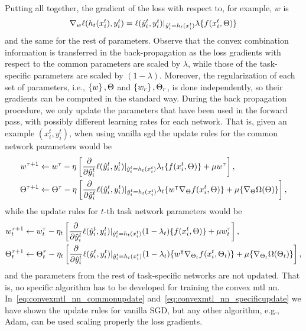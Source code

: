 Putting all together, the gradient of the loss with respect to, for example, $w$ is 
$$  \nabla_w \ell(h_t(x_i^t), y_i^t)  =\ell(\hat{y}_i^t, y_i^t) \vert_{\hat{y}_i^t = h_t(x_i^t)} \lambda \lbrace f(x_i^t, \Theta) \rbrace $$
and the same for the rest of parameters.
%
Observe that the convex combination information is transferred in the back-propagation as the loss gradients with respect to the common parameters are scaled by $\lambda$, while those of the task-specific parameters are scaled by $(1 - \lambda)$.
%
Moreover, the regularization of each set of parameters, i.e., $\left\{w\right\}, \Theta$ and $\left\{w_r\right\}, \Theta_r$, is done independently, so their gradients can be computed in the standard way.
%
During the back propagation procedure, we only update the parameters that have been used in the forward pass, with possibly different learning rates for each network. 
That is, given an example $(x_i^t, y_i^t)$, when using vanilla \acrfull{sgd} the update rules for the common network parameters would be
\begin{equation}\label{eq:convexmtl_nn_commonupdate}
    \begin{aligned}
        w^{\tau + 1} &\gets w^\tau - \eta \left[  \frac{\partial}{\partial \hat{y}_i^t}  \lossf(\hat{y}_i^t, y_i^t) \vert_{\hat{y}_i^t = h_t(x_i^t)} \lambda_t \lbrace f(x_i^t, \Theta) \rbrace + \mu w^\tau \right], \\
        \Theta^{\tau + 1} &\gets \Theta^\tau - \eta \left[ \frac{\partial}{\partial \hat{y}_i^t}  \lossf(\hat{y}_i^t, y_i^t) \vert_{\hat{y}_i^t = h_t(x_i^t)}  \lambda_t \lbrace w^\intercal \nabla_\Theta f(x_i^t, \Theta)\rbrace + \mu \lbrace \nabla_\Theta \Omega( \Theta)  \rbrace \right],
    \end{aligned}
\end{equation}
while the update rules for $t$-th task network parameters would be
\begin{equation}\label{eq:convexmtl_nn_specificupdate}
    \begin{aligned}
        w_t^{\tau + 1} &\gets w_t^\tau - \eta_t \left[  \frac{\partial}{\partial \hat{y}_i^t}  \lossf(\hat{y}_i^t, y_i^t) \vert_{\hat{y}_i^t = h_t(x_i^t)} (1 - \lambda_t) \lbrace f(x_i^t, \Theta) \rbrace + \mu w_t^\tau \right], \\
        \Theta_t^{\tau + 1} &\gets \Theta_t^\tau - \eta_t \left[ \frac{\partial}{\partial \hat{y}_i^t}  \lossf(\hat{y}_i^t, y_i^t) \vert_{\hat{y}_i^t = h_t(x_i^t)}  (1 - \lambda_t) \lbrace w^\intercal \nabla_{\Theta_t} f(x_i^t, \Theta_t)\rbrace + \mu \lbrace \nabla_{\Theta_t} \Omega( \Theta_t) \rbrace \right],
    \end{aligned}
\end{equation}
and the parameters from the rest of task-specific networks are not updated.
%
That is, no specific algorithm has to be developed for training the convex \acrshort{mtl} \acrshort{nn}. In~\eqref{eq:convexmtl_nn_commonupdate} and~\eqref{eq:convexmtl_nn_specificupdate} we have shown the update rules for vanilla SGD, but any other algorithm, e.g., Adam, can be used scaling properly the loss gradients.

